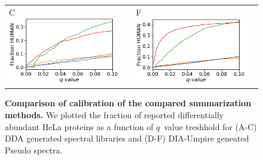 \documentclass[11pt]{article}
\begin{document}
\begin{figure}[hbt]
\begin{tabular}{lclc}
        C \includegraphics[width=0.5\linewidth]{../../result/report_plots/osw_FP_DE_all.png} & &%
        F \includegraphics[width=0.5\linewidth]{../../result/report_plots/diann_FP_DE_all.png} & \\%
    \end{tabular}
  \caption{{\bf Comparison of calibration of the compared summarization methods.} We plotted the fraction of reported differentially abundant HeLa proteins as a function of $q$~value treshhold for (A-C) DDA generated spectral libraries and (D-F) DIA-Umpire geneated Pseudo spectra. \label{fig:frac_hela_vs_fdr}}
\end{figure}
\end{document}
